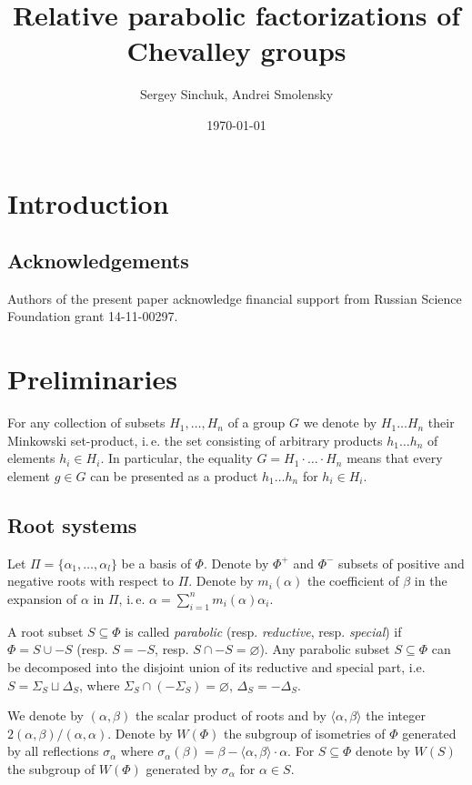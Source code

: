 \documentclass[12pt]{amsart}
\title{Relative parabolic factorizations of Chevalley groups}
\author {Sergey Sinchuk, Andrei Smolensky}
\date {\today}
\numberwithin{equation}{section}
\theoremstyle{definition}
\begin{document}

\maketitle

\section{Introduction}\label{sec:intro}
 
\subsection{Acknowledgements}
Authors of the present paper acknowledge financial support from Russian Science Foundation grant 14-11-00297.

\section{Preliminaries}\label{sec:prelim}
For any collection of subsets $H_1,\ldots, H_n$ of a group $G$ we denote by $H_1\ldots H_n$ their Minkowski set-product,
i.\,e. the set consisting of arbitrary products $h_1\ldots h_n$ of elements $h_i\in H_i$. In particular, the equality
$G = H_1\cdot\ldots\cdot H_n$ means that every element $g\in G$ can be presented as a product $h_1\ldots h_n$ for $h_i\in H_i$.

\subsection{Root systems}
Let $\Pi=\{\alpha_1, \ldots, \alpha_l\}$ be a basis of $\Phi$. Denote by $\Phi^+$ and $\Phi^-$ subsets of positive and negative roots with respect to $\Pi$.
Denote by $m_i(\alpha)$ the coefficient of $\beta$ in the expansion of $\alpha$ in $\Pi$, i.\,e. $\alpha = \sum\limits_{i=1}^n m_i(\alpha) \alpha_i$.

A root subset $S\subseteq \Phi$ is called {\it parabolic} (resp. {\it reductive}, resp. {\it special}) if $\Phi=S \cup -S$ (resp. $S = -S$, resp. $S \cap -S=\varnothing$).
Any parabolic subset $S \subseteq \Phi$ can be decomposed into the disjoint union of its reductive and special part, i.e. 
$S = \Sigma_S \sqcup \Delta_S$, where $\Sigma_S \cap (-\Sigma_S) = \varnothing$, $\Delta_S = -\Delta_S$.

We denote by $(\alpha, \beta)$ the scalar product of roots and by $\langle \alpha, \beta\rangle$ the integer $2(\alpha, \beta)/(\alpha, \alpha)$.
Denote by $W(\Phi)$ the subgroup of isometries of $\Phi$ generated by all reflections $\sigma_\alpha$ where $\sigma_\alpha(\beta)=\beta-\langle\alpha,\beta \rangle\cdot \alpha$.
For $S\subseteq \Phi$ denote by $W(S)$ the subgroup of $W(\Phi)$ generated by $\sigma_\alpha$ for $\alpha\in S$.
\end{document}
